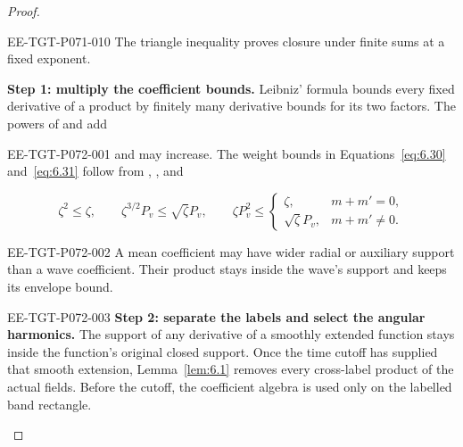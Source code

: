 \begin{proof}
\begin{EESegment}{EE-TGT-P071-010}
The triangle inequality proves closure under finite sums at a fixed exponent.

\textbf{Step 1: multiply the coefficient bounds.} Leibniz' formula bounds every fixed derivative of a product by finitely many derivative bounds for its two factors. The powers of  and  add
\end{EESegment}
%
\begin{EESegment}{EE-TGT-P072-001}
and may increase. The weight bounds in Equations~\eqref{eq:6.30} and~\eqref{eq:6.31} follow from , , and
\end{EESegment}
\[
  \zeta^2\le\zeta,
  \qquad \zeta^{3/2}P_v\le\sqrt\zeta P_v,
  \qquad
  \zeta P_v^2\le
  \begin{cases}
    \zeta,&m+m'=0,\\
    \sqrt\zeta P_v,&m+m'\ne0.
  \end{cases}
\]
\begin{EESegment}{EE-TGT-P072-002}
A mean coefficient may have wider radial or auxiliary support than a wave coefficient. Their product stays inside the wave's support and keeps its envelope bound.
\end{EESegment}

\begin{EESegment}{EE-TGT-P072-003}
\textbf{Step 2: separate the labels and select the angular harmonics.} The support of any derivative of a smoothly extended function stays inside the function's original closed support. Once the time cutoff has supplied that smooth extension, Lemma~\ref{lem:6.1} removes every cross-label product of the actual fields. Before the cutoff, the coefficient algebra is used only on the labelled band rectangle.
\end{EESegment}


\end{proof}
